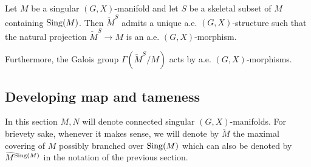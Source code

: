 					\begin{cor}\label{cor:singular_manifold_skeletal_subset} Let $M$ be a singular $(G,X)$-manifold and let $S$ be a skeletal subset of $M$ containing $\mathrm{Sing}(M)$. Then $\widetilde M^S$ admits a unique a.e. $(G,X)$-structure such that the natural projection $\widetilde M^S\rightarrow M$ is an a.e. $(G,X)$-morphism.
					
					Furthermore, the Galois group $\Gamma(\widetilde M^S/M)$ acts by a.e. $(G,X)$-morphisms. 
					 
					\end{cor}








\subsection{Developing map and tameness}


In this section $M,N$ will denote connected singular $(G,X)$-manifolds. 
For brievety sake, whenever it makes sense, we will denote by $\widetilde M$ the maximal covering of $M$ possibly branched over $\mathrm{Sing}(M)$ which can also be denoted by $\widetilde M^{\mathrm{Sing}(M)}$ in the notation of the previous section. 




% 

